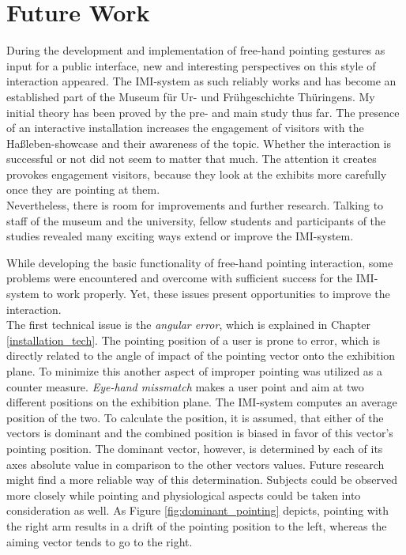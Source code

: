 \chapter{Future Work}
\label{future_work}

During the development and implementation of free-hand pointing gestures as input for a public interface, new and interesting perspectives on this style of interaction appeared. The \ac{IMI}-system as such reliably works and has become an established part of the Museum für Ur- und Frühgeschichte Thüringens. My initial theory has been proved by the pre- and main study thus far. The presence of an interactive installation increases the engagement of visitors with the Haßleben-showcase and their awareness of the topic. Whether the interaction is successful or not did not seem to matter that much. The attention it creates provokes engagement visitors, because they look at the exhibits more carefully once they are pointing at them. 
\\
Nevertheless, there is room for improvements and further research. Talking to staff of the museum and the university, fellow students and participants of the studies revealed many exciting ways extend or improve the \ac{IMI}-system. 

While developing the basic functionality of free-hand pointing interaction, some problems were encountered and overcome with sufficient success for the \ac{IMI}-system to work properly. Yet, these issues present opportunities to improve the interaction.
\\
The first technical issue is the \textit{angular error}, which is explained in Chapter \ref{installation_tech}. The pointing position of a user is prone to error, which is directly related to the angle of impact of the pointing vector onto the exhibition plane. To minimize this another aspect of improper pointing was utilized as a counter measure. \textit{Eye-hand missmatch} makes a user point and aim at two different positions on the exhibition plane. The \ac{IMI}-system computes an average position of the two. To calculate the position, it is assumed, that either of the vectors is dominant and the combined position is biased in favor of this vector's pointing position. The dominant vector, however, is determined by each of its axes absolute value in comparison to the other vectors values. Future research might find a more reliable way of this determination. Subjects could be observed more closely while pointing and physiological aspects could be taken into consideration as well. As Figure \ref{fig:dominant_pointing} depicts, pointing with the right arm results in a drift of the pointing position to the left, whereas the aiming vector tends to go to the right.

